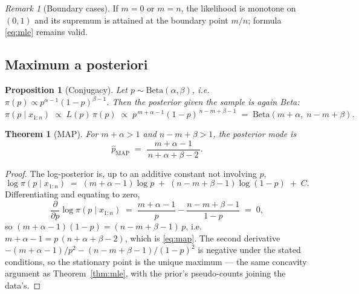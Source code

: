 \documentclass[11pt]{article}
\newtheorem{theorem}{Theorem}
\newtheorem{proposition}{Proposition}
\theoremstyle{remark}
\newtheorem{remark}{Remark}
\newcommand{\phat}{\hat{p}}
\begin{document}
\begin{remark}[Boundary cases]
If $m = 0$ or $m = n$, the likelihood is monotone on $(0,1)$ and its
supremum is attained at the boundary point $m/n$; formula
\eqref{eq:mle} remains valid.
\end{remark}

\subsection{Maximum a posteriori}

\begin{proposition}[Conjugacy]
Let $p \sim \mathrm{Beta}(\alpha, \beta)$, i.e.\
$\pi(p) \propto p^{\alpha-1}(1-p)^{\beta-1}$. Then the posterior given
the sample is again Beta:
\begin{equation}
  \pi(p \mid x_{1:n}) \;\propto\; L(p)\,\pi(p)
  \;\propto\; p^{\,m+\alpha-1}(1-p)^{\,n-m+\beta-1}
  \;=\; \mathrm{Beta}(m + \alpha,\; n - m + \beta).
\end{equation}
\end{proposition}

\begin{theorem}[MAP]
For $m + \alpha > 1$ and $n - m + \beta > 1$, the posterior mode is
\begin{equation}
  \boxed{\;\phat_{\mathrm{MAP}}
  \;=\; \frac{m + \alpha - 1}{\,n + \alpha + \beta - 2\,}.\;}
  \label{eq:map}
\end{equation}
\end{theorem}

\begin{proof}
The log-posterior is, up to an additive constant not involving $p$,
\begin{equation*}
  \log \pi(p \mid x_{1:n})
  \;=\; (m + \alpha - 1)\log p \;+\; (n - m + \beta - 1)\log(1 - p)
  \;+\; C.
\end{equation*}
Differentiating and equating to zero,
\begin{equation*}
  \frac{\partial}{\partial p}\log \pi(p \mid x_{1:n})
  \;=\; \frac{m + \alpha - 1}{p} - \frac{n - m + \beta - 1}{1 - p}
  \;=\; 0,
\end{equation*}
so $(m + \alpha - 1)(1 - p) = (n - m + \beta - 1)\,p$, i.e.\
$m + \alpha - 1 = p\,(n + \alpha + \beta - 2)$, which is
\eqref{eq:map}. The second derivative
$-(m{+}\alpha{-}1)/p^2 - (n{-}m{+}\beta{-}1)/(1{-}p)^2$ is negative
under the stated conditions, so the stationary point is the unique
maximum --- the same concavity argument as Theorem~\ref{thm:mle},
with the prior's pseudo-counts joining the data's.
\end{proof}
\end{document}
